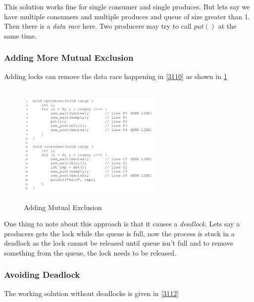 This solution works fine for single consumer and single produces. But lets say
we have multiple consumers and multiple produces and queue of size greater than
1. Then there is a \textit{data race} here. Two producers may try to call
$put()$ at the same time.\\

\subsubsection{Adding More Mutual Exclusion}

Adding locks can remove the data race happening in \ref{3110} as shown in 
\ref{3111}

\begin{figure}[h!]
    \label{3111}
    \begin{center}
        \includegraphics[width=7cm, height=6cm]{img/3111.png}
        \caption{Adding Mutual Exclusion}
    \end{center}
\end{figure}

One thing to note about this approach is that it causes a \textit{deadlock}. 
Lets say a producers gets the lock while the queue is full, now the process
is stuck in a deadlock as the lock cannot be released until queue isn't full and
to remove something from the queue, the lock needs to be released.

\subsubsection{Avoiding Deadlock}

The working solution without deadlocks is given in \ref{3112}


